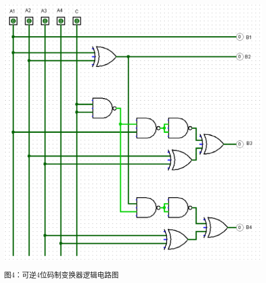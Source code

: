 \documentclass{ctexart}
\begin{document}
    \begin{minipage}[c]{\textwidth}
        \centering 
        \includegraphics[width=0.9\linewidth]{4.png} 
        
        图4：可逆4位码制变换器逻辑电路图
    \end{minipage}
\end{document}
